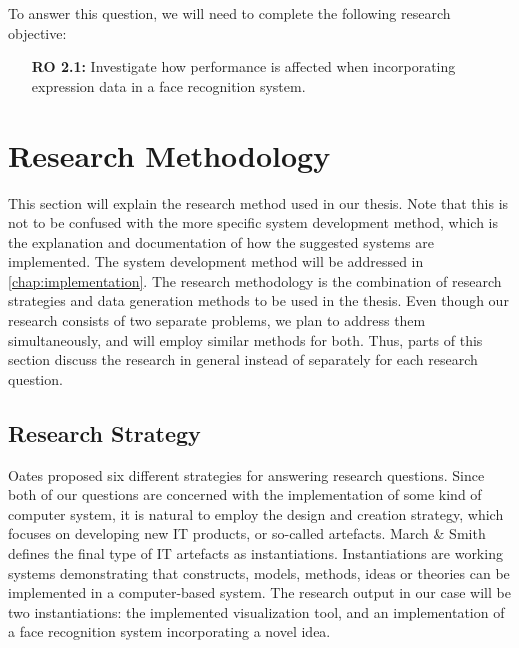 \noindent To answer this question, we will need to complete the following research objective:

\begin{enumerate}[align=left, labelwidth=3.5em, leftmargin=!, itemindent=0em]
    \item[\textbf{RO 2.1:}] Investigate how performance is affected when incorporating expression data in a face recognition system.
\end{enumerate}

\section{Research Methodology}

This section will explain the research method used in our thesis. Note that this is not to be confused with the more specific system development method, which is the explanation and documentation of how the suggested systems are implemented. The system development method will be addressed in \autoref{chap:implementation}. The research methodology is the combination of research strategies and data generation methods to be used in the thesis. Even though our research consists of two separate problems, we plan to address them simultaneously, and will employ similar methods for both. Thus, parts of this section discuss the research in general instead of separately for each research question.

\subsection{Research Strategy}

Oates \cite{oates} proposed six different strategies for answering research questions. Since both of our questions are concerned with the implementation of some kind of computer system, it is natural to employ the design and creation strategy, which focuses on developing new IT products, or so-called artefacts. March \& Smith \cite{march-smith} defines the final type of IT artefacts as instantiations. Instantiations are working systems demonstrating that constructs, models, methods, ideas or theories can be implemented in a computer-based system. The research output in our case will be two instantiations: the implemented visualization tool, and an implementation of a face recognition system incorporating a novel idea. \\

